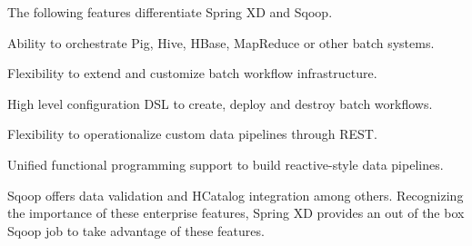 The following features differentiate Spring XD and Sqoop.

\begin{itemize*}
\item Ability to orchestrate Pig, Hive, HBase, MapReduce or other batch systems.
\item Flexibility to extend and customize batch workflow infrastructure.
\item High level configuration DSL to create, deploy and destroy batch workflows.
\item Flexibility to operationalize custom data pipelines through REST.
\item Unified functional programming support to build reactive-style data pipelines.
\end{itemize*}

Sqoop offers data validation and HCatalog integration among others. Recognizing the
importance of these enterprise features, Spring XD provides an out of the box Sqoop
job to take advantage of these features.
